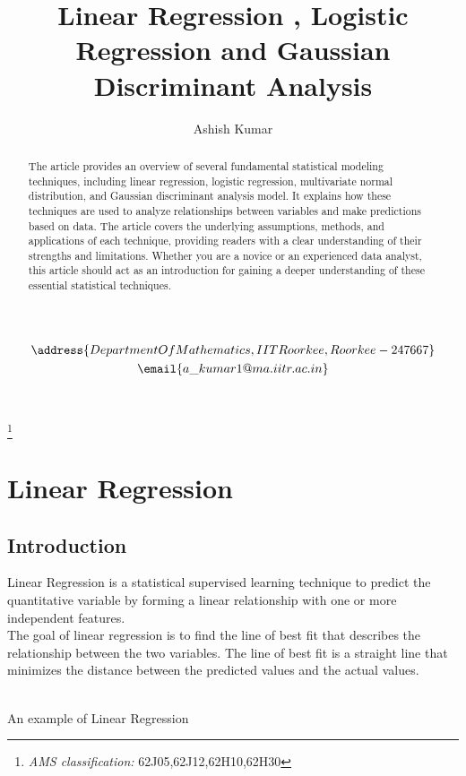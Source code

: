\documentclass[a4paper,12pt,reqno]{amsart}
\title{Linear Regression , Logistic Regression and Gaussian Discriminant Analysis}
\author{Ashish Kumar}
\begin{document}
\maketitle
\begin{gather*}
    \address{Department Of Mathematics, IIT Roorkee, Roorkee - 247667}\\
\email{a\_kumar1@ma.iitr.ac.in}
\end{gather*}

\\

\begin{abstract}
    The article provides an overview of several fundamental statistical modeling techniques, including linear regression, logistic regression, multivariate normal distribution, and Gaussian discriminant analysis model. It explains how these techniques are used to analyze relationships between variables and make predictions based on data. The article covers the underlying assumptions, methods, and applications of each technique, providing readers with a clear understanding of their strengths and limitations. Whether you are a novice or an experienced data analyst, this article should act as an introduction for gaining a deeper understanding of these essential statistical techniques.
\end{abstract}
\renewcommand{\thefootnote}{\fnsymbol{footnote}}
\footnote[0]{\textit{AMS classification:} 62J05,62J12,62H10,62H30}
\pagebreak
\tableofcontents
\pagebreak
\section{Linear Regression}
\subsection{Introduction}
Linear Regression is a statistical supervised learning technique to predict the quantitative variable by forming a linear relationship with one or more independent features.\\
The goal of linear regression is to find the line of best fit that describes the relationship between the two variables. The line of best fit is a straight line that minimizes the distance between the predicted values and the actual values. 

\begin{center}
\\
An example of Linear Regression
\end{center}
\end{document}
